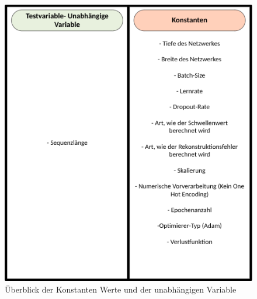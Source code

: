 \documentclass[a4paper,12pt]{article}
\begin{document}
	\begin{figure}
		\centering
		\includegraphics[width=1.1\linewidth]{Bilder/variablen-architektur}
		\caption{Überblick der Konstanten Werte und der unabhängigen Variable}
		\label{fig:variablen-architektur}
	\end{figure}
\end{document}
